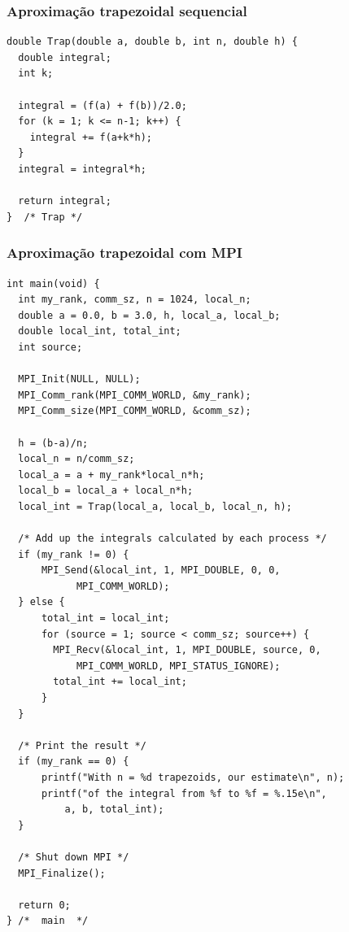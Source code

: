 \documentclass[xcolor={usenames,dvipsnames},12pt,presentation,aspectratio=169]{beamer}
\begin{document}
\begin{frame}[fragile]
  \frametitle{Aproximação trapezoidal sequencial}
\begin{center}
\begin{minipage}{0.95\textwidth}
  \begin{verbatim}
double Trap(double a, double b, int n, double h) {
  double integral;
  int k;

  integral = (f(a) + f(b))/2.0;
  for (k = 1; k <= n-1; k++) {
    integral += f(a+k*h);
  }
  integral = integral*h;

  return integral;
}  /* Trap */   
  \end{verbatim}
\end{minipage}
\end{center}
\end{frame}
\begin{frame}[fragile]
  \frametitle{Aproximação trapezoidal com MPI}
\begin{center}
\begin{minipage}{0.95\textwidth}
  \begin{verbatim}
int main(void) {
  int my_rank, comm_sz, n = 1024, local_n;   
  double a = 0.0, b = 3.0, h, local_a, local_b;
  double local_int, total_int;
  int source; 

  MPI_Init(NULL, NULL);
  MPI_Comm_rank(MPI_COMM_WORLD, &my_rank);
  MPI_Comm_size(MPI_COMM_WORLD, &comm_sz);

  h = (b-a)/n;    
  local_n = n/comm_sz; 
  local_a = a + my_rank*local_n*h;
  local_b = local_a + local_n*h;
  local_int = Trap(local_a, local_b, local_n, h);

  /* Add up the integrals calculated by each process */
  if (my_rank != 0) { 
      MPI_Send(&local_int, 1, MPI_DOUBLE, 0, 0, 
            MPI_COMM_WORLD); 
  } else {
      total_int = local_int;
      for (source = 1; source < comm_sz; source++) {
        MPI_Recv(&local_int, 1, MPI_DOUBLE, source, 0,
            MPI_COMM_WORLD, MPI_STATUS_IGNORE);
        total_int += local_int;
      }
  } 

  /* Print the result */
  if (my_rank == 0) {
      printf("With n = %d trapezoids, our estimate\n", n);
      printf("of the integral from %f to %f = %.15e\n",
          a, b, total_int);
  }

  /* Shut down MPI */
  MPI_Finalize();

  return 0;
} /*  main  */
  \end{verbatim}
\end{minipage}
\end{center}
\end{frame}
\end{document}
